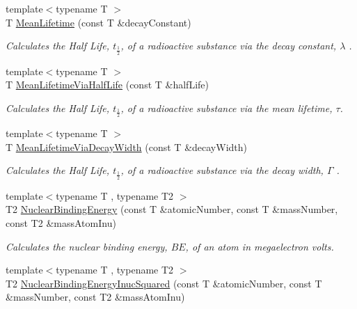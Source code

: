 \begin{DoxyCompactItemize}
{\footnotesize template$<$typename T $>$ }\\T \mbox{\hyperlink{group___e_g_x_phys-_mean_lifetime_gaa9e3c2deedda4bc7a745568b06fc47eb}{Mean\+Lifetime}} (const T \&decay\+Constant)
\begin{DoxyCompactList}\small\item\em Calculates the Half Life, $t_{\frac{1}{2}}$, of a radioactive substance via the decay constant, $\lambda$ . \end{DoxyCompactList}\item 
{\footnotesize template$<$typename T $>$ }\\T \mbox{\hyperlink{group___e_g_x_phys-_mean_lifetime_ga2586e148263e1f6c8ff89f269a0930ea}{Mean\+Lifetime\+Via\+Half\+Life}} (const T \&half\+Life)
\begin{DoxyCompactList}\small\item\em Calculates the Half Life, $t_{\frac{1}{2}}$, of a radioactive substance via the mean lifetime, $\tau$. \end{DoxyCompactList}\item 
{\footnotesize template$<$typename T $>$ }\\T \mbox{\hyperlink{group___e_g_x_phys-_mean_lifetime_ga8a1dda4168b4b25db93bf1ae7832fd7e}{Mean\+Lifetime\+Via\+Decay\+Width}} (const T \&decay\+Width)
\begin{DoxyCompactList}\small\item\em Calculates the Half Life, $t_{\frac{1}{2}}$, of a radioactive substance via the decay width, $\Gamma$ . \end{DoxyCompactList}\item 
{\footnotesize template$<$typename T , typename T2 $>$ }\\T2 \mbox{\hyperlink{group___e_g_x_phys-_nuclear_binding_energy_gab6832bf15ead7b4e867e759e0a2a078e}{Nuclear\+Binding\+Energy}} (const T \&atomic\+Number, const T \&mass\+Number, const T2 \&mass\+Atom\+Inu)
\begin{DoxyCompactList}\small\item\em Calculates the nuclear binding energy, $BE$, of an atom in megaelectron volts. \end{DoxyCompactList}\item 
{\footnotesize template$<$typename T , typename T2 $>$ }\\T2 \mbox{\hyperlink{group___e_g_x_phys-_nuclear_binding_energy_gafeed0fb7220e4900a8da011ed9fca44f}{Nuclear\+Binding\+Energy\+Inuc\+Squared}} (const T \&atomic\+Number, const T \&mass\+Number, const T2 \&mass\+Atom\+Inu)

\end{DoxyCompactItemize}
